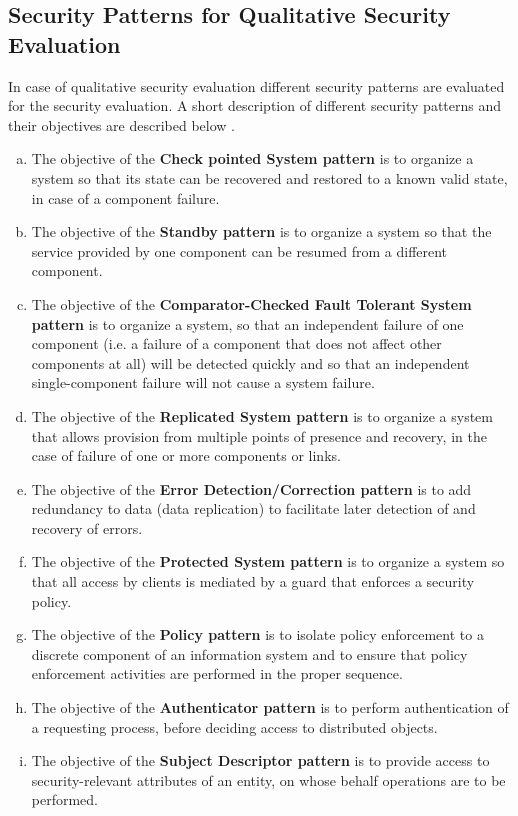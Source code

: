 \documentclass[pdftex,english,oribibl]{llncs}
\begin{document}
\subsection{Security Patterns for Qualitative Security Evaluation}
In case of qualitative security evaluation different security patterns are evaluated for the security evaluation.  A short description of different security patterns and their objectives are described below \cite{HALKIDIS2006379}.
\begin{enumerate}[(a)]
	\item{The objective of the \textbf{Check pointed System pattern} is to organize a system so that its state can be recovered and restored to a known valid state, in case of a component failure.}
	\item{The objective of the \textbf{Standby pattern} is to organize a system so that the service provided by one component can be resumed from a different component.}
	\item{The objective of the \textbf{Comparator-Checked Fault Tolerant System pattern} is to organize a system, so that an independent failure of one component (i.e. a failure of a component that does not affect other components at all) will be detected quickly and so that an independent single-component failure will not cause a system failure.}
	\item {The objective of the \textbf{Replicated System pattern} is to organize a system that allows provision from multiple points of presence and recovery, in the case of failure of one or more components or links.}
	\item {The objective of the \textbf{Error Detection/Correction pattern} is to add redundancy to data (data replication) to facilitate later detection of and recovery of errors.}
	\item {The objective of the\textbf{ Protected System pattern} is to organize a system so that all access by clients is mediated by a guard that enforces a security policy.}
	\item{The objective of the \textbf{Policy pattern} is to isolate policy enforcement to a discrete component of an information system and to ensure that policy enforcement activities are performed in the proper sequence.}
	\item{The objective of the \textbf{Authenticator pattern} is to perform authentication of a requesting process, before deciding access to distributed objects.}
	\item{The objective of the \textbf{Subject Descriptor pattern} is to provide access to security-relevant attributes of an entity, on whose behalf operations are to be performed.}

\end{enumerate}
\end{document}
